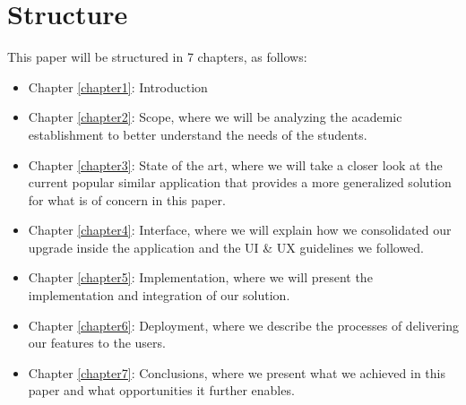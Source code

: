 \section{Structure} \label{1:structure}
This paper will be structured in 7 chapters, as follows:
\begin{itemize}
            \setlength{\topsep}{0.5pt}
            \setlength{\itemsep}{0.5pt}
            \setlength{\parsep}{0.5pt}
            \item Chapter \ref{chapter1}: Introduction
            \item Chapter \ref{chapter2}: Scope, where we will be analyzing the academic establishment to better understand the needs of the students.
            \item Chapter \ref{chapter3}: State of the art, where we will take a closer look at the current popular similar application that provides a more generalized solution for what is of concern in this paper.
            \item Chapter \ref{chapter4}: Interface, where we will explain how we consolidated our upgrade inside the application and the UI \& UX guidelines we followed.
            \item Chapter \ref{chapter5}: Implementation, where we will present the implementation and integration of our solution.
            \item Chapter \ref{chapter6}: Deployment, where we describe the processes of delivering our features to the users.
            \item Chapter \ref{chapter7}: Conclusions, where we present what we achieved in this paper and what opportunities it further enables.
        \end{itemize}

\clearpage






